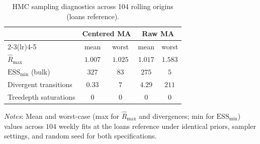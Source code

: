 \documentclass[12pt]{article}
\theoremstyle{remark}
\begin{document}
\begin{table}[!t]
\centering
\caption{HMC sampling diagnostics across 104 rolling origins (loans reference).}
\label{tab:hmc-diagnostics}
\begin{tabular}{lcccc}
\toprule
 & \multicolumn{2}{c}{Centered MA} & \multicolumn{2}{c}{Raw MA} \\
\cmidrule(lr){2-3}\cmidrule(lr){4-5}
 & mean & worst & mean & worst \\
\midrule
$\widehat{R}_{\max}$        & $1.007$ & $1.025$ & $1.017$ & $1.583$ \\
$\text{ESS}_{\min}$ (bulk)  & $327$   & $83$    & $275$   & $5$    \\
Divergent transitions       & $0.33$  & $7$     & $4.29$  & $211$    \\
Treedepth saturations       & $0$     & $0$     & $0$     & $0$     \\
\bottomrule
\end{tabular}

\vspace{0.4em}
\footnotesize\emph{Notes}: Mean and worst-case (max for $\widehat{R}_{\max}$ and divergences; min for $\text{ESS}_{\min}$) values across $104$ weekly fits at the loans reference under identical priors, sampler settings, and random seed for both specifications.
\end{table}

\clearpage



\end{document}
